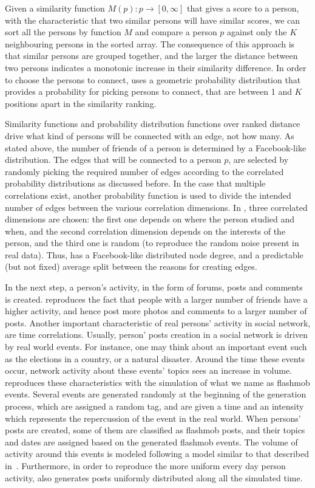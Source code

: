 Given a similarity function $M(p) : p \rightarrow [0, \infty]$ that gives a score to a person,
with the characteristic that two similar persons will have similar scores, we
can sort all the persons by function $M$ and compare a person $p$ against only the
$K$ neighbouring persons in the sorted array. The consequence of this approach is
that similar persons are grouped together, and the larger the
distance between two persons indicates a monotonic increase in their similarity
difference. In order to choose the persons to connect, \datagen uses a geometric
probability distribution that provides a probability for picking persons to
connect, that are between 1 and $K$ positions apart in the similarity
ranking.

Similarity functions and probability distribution functions over ranked
distance drive what kind of persons will be connected with an edge, not how
many. As stated above, the number of friends of a person is determined by a
Facebook-like distribution. The edges that will be connected to a person $p$,
are selected by randomly picking the required number of edges according to the
correlated probability distributions as discussed before. In the case that
multiple correlations exist, another probability function is used to divide the
intended number of edges between the various correlation dimensions. In \datagen,
three correlated dimensions are chosen: the first one depends on where the
person studied and when, and the second correlation dimension depends on the
interests of the person, and the third one is random (to reproduce the random
noise present in real data). Thus, \datagen has a Facebook-like distributed node
degree, and a predictable (but not fixed) average split between the reasons for
creating edges.

In the next step, a person's activity, in the form of forums, posts and comments
is created. \datagen reproduces the fact that people with a larger number of
friends have a higher activity, and hence post more photos and comments to a
larger number of posts. Another important characteristic of real persons'
activity in social network, are time correlations.  Usually, person' posts
creation in a social network is driven by real world events.  For
instance, one may think about an important event such as the elections in a
country, or a natural disaster. Around the time these events occur, network
activity about these events' topics sees an increase in volume. \datagen
reproduces these characteristics with the simulation of what we name as
flashmob events.  Several events are generated randomly at the beginning of the
generation process, which are assigned a random tag, and are given a time and
an intensity which represents the repercussion of the event in the real world.
When persons' posts are created, some of them are classified as flashmob posts,
and their topics and dates are assigned based on the generated flashmob events.
The volume of activity around this events is modeled following a model similar
to that described in~\cite{DBLP:conf/kdd/LeskovecBKT08}. Furthermore, in order to reproduce the
more uniform every day person activity, \datagen also generates posts uniformly
distributed along all the simulated time.


